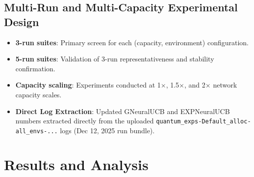 \documentclass[12pt,a4paper]{article}
\begin{document}
\subsection{Multi-Run and Multi-Capacity Experimental Design}
\begin{itemize}
\item \textbf{3-run suites}: Primary screen for each (capacity, environment) configuration.
\item \textbf{5-run suites}: Validation of 3-run representativeness and stability confirmation.
\item \textbf{Capacity scaling}: Experiments conducted at 1$\times$, 1.5$\times$, and 2$\times$ network capacity scales.
\item \textbf{Direct Log Extraction}: Updated GNeuralUCB and EXPNeuralUCB numbers extracted directly from the uploaded \texttt{quantum\_exps-Default\_alloc-all\_envs-...} logs (Dec 12, 2025 run bundle).
\end{itemize}

\newpage
\section{Results and Analysis}
\end{document}
